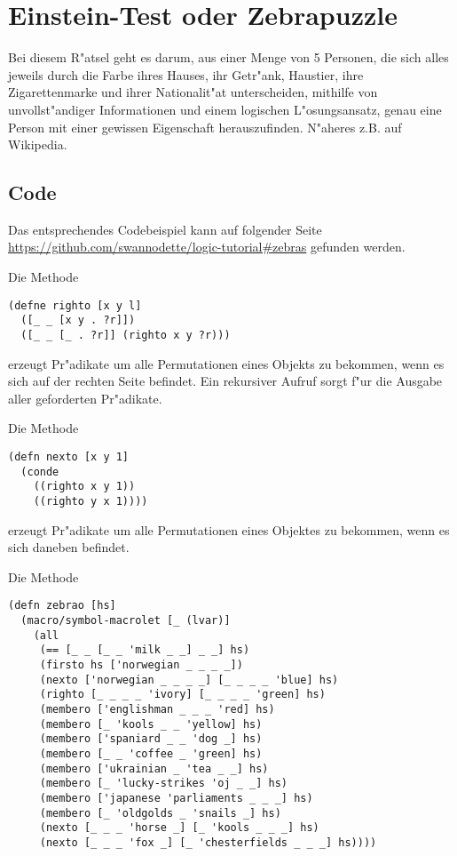 \section{Einstein-Test oder Zebrapuzzle}

Bei diesem R"atsel geht es darum, aus einer Menge von 5 Personen, die sich alles jeweils durch die Farbe ihres Hauses, ihr Getr"ank, Haustier, ihre Zigarettenmarke und ihrer Nationalit"at unterscheiden, mithilfe von unvollst"andiger Informationen und einem logischen L"osungsansatz, genau eine Person mit einer gewissen Eigenschaft herauszufinden. N"aheres z.B. auf Wikipedia.

\subsection{Code}

Das entsprechendes Codebeispiel kann auf folgender Seite \url{https://github.com/swannodette/logic-tutorial#zebras} gefunden werden.

Die Methode 

\begin{lstlisting}
(defne righto [x y l]
  ([_ _ [x y . ?r]])
  ([_ _ [_ . ?r]] (righto x y ?r)))
\end{lstlisting}

erzeugt Pr"adikate um alle Permutationen eines Objekts zu bekommen, wenn es sich auf der rechten Seite befindet. Ein rekursiver Aufruf sorgt f"ur die Ausgabe aller geforderten Pr"adikate.

Die Methode 

\begin{lstlisting}
(defn nexto [x y 1]
  (conde
    ((righto x y 1))
    ((righto y x 1))))
\end{lstlisting}

erzeugt Pr"adikate um alle Permutationen eines Objektes zu bekommen, wenn es sich daneben befindet.

Die Methode 

\begin{lstlisting}
(defn zebrao [hs]
  (macro/symbol-macrolet [_ (lvar)]
    (all
     (== [_ _ [_ _ 'milk _ _] _ _] hs)
     (firsto hs ['norwegian _ _ _ _])
     (nexto ['norwegian _ _ _ _] [_ _ _ _ 'blue] hs)
     (righto [_ _ _ _ 'ivory] [_ _ _ _ 'green] hs)
     (membero ['englishman _ _ _ 'red] hs)
     (membero [_ 'kools _ _ 'yellow] hs)
     (membero ['spaniard _ _ 'dog _] hs)
     (membero [_ _ 'coffee _ 'green] hs)
     (membero ['ukrainian _ 'tea _ _] hs)
     (membero [_ 'lucky-strikes 'oj _ _] hs)
     (membero ['japanese 'parliaments _ _ _] hs)
     (membero [_ 'oldgolds _ 'snails _] hs)
     (nexto [_ _ _ 'horse _] [_ 'kools _ _ _] hs)
     (nexto [_ _ _ 'fox _] [_ 'chesterfields _ _ _] hs))))
\end{lstlisting}

